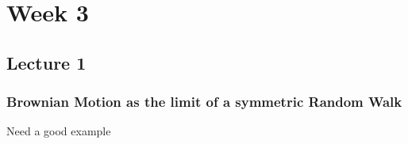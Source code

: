 \documentclass[12pt,a4paper]{article}
\newcommand{\headerline}{
    \noindent\makebox[\linewidth]{\rule{\paperwidth}{0.4pt}}
}
\begin{document}
\begin{center}
 \\
 \\
 \\
\end{center}
\headerline
\pagebreak
\section{Week 3}
\subsection{Lecture 1}
\subsubsection{Brownian Motion as the limit of a symmetric Random Walk}
Need a good example
\pagebreak
\end{document}
